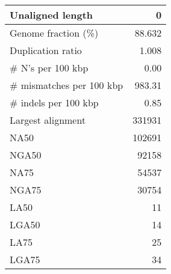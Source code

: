 \documentclass[12pt,a4paper]{article}
\begin{document}
\begin{table}[ht]
\begin{center}
\begin{tabular}{|l*{1}{|r}|}
Unaligned length & 0 \\ \hline
Genome fraction (\%) & 88.632 \\ \hline
Duplication ratio & 1.008 \\ \hline
\# N's per 100 kbp & 0.00 \\ \hline
\# mismatches per 100 kbp & 983.31 \\ \hline
\# indels per 100 kbp & 0.85 \\ \hline
Largest alignment & 331931 \\ \hline
NA50 & 102691 \\ \hline
NGA50 & 92158 \\ \hline
NA75 & 54537 \\ \hline
NGA75 & 30754 \\ \hline
LA50 & 11 \\ \hline
LGA50 & 14 \\ \hline
LA75 & 25 \\ \hline
LGA75 & 34 \\ \hline
\end{tabular}
\end{center}
\end{table}
\end{document}
